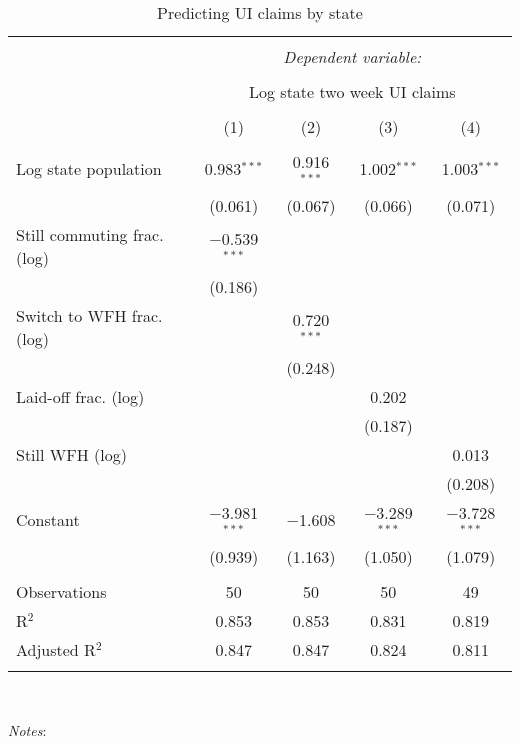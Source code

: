 
\begin{table}[!htbp] \centering 
  \caption{Predicting UI claims by state} 
  \label{tab:ui} 
\small 
\begin{tabular}{@{\extracolsep{5pt}}lcccc} 
\\[-1.8ex]\hline 
\hline \\[-1.8ex] 
 & \multicolumn{4}{c}{\textit{Dependent variable:}} \\ 
\cline{2-5} 
\\[-1.8ex] & \multicolumn{4}{c}{Log state two week UI claims} \\ 
\\[-1.8ex] & (1) & (2) & (3) & (4)\\ 
\hline \\[-1.8ex] 
 Log state population & 0.983$^{***}$ & 0.916$^{***}$ & 1.002$^{***}$ & 1.003$^{***}$ \\ 
  & (0.061) & (0.067) & (0.066) & (0.071) \\ 
  Still commuting frac. (log) & $-$0.539$^{***}$ &  &  &  \\ 
  & (0.186) &  &  &  \\ 
  Switch to WFH frac. (log) &  & 0.720$^{***}$ &  &  \\ 
  &  & (0.248) &  &  \\ 
  Laid-off frac. (log) &  &  & 0.202 &  \\ 
  &  &  & (0.187) &  \\ 
  Still WFH (log) &  &  &  & 0.013 \\ 
  &  &  &  & (0.208) \\ 
  Constant & $-$3.981$^{***}$ & $-$1.608 & $-$3.289$^{***}$ & $-$3.728$^{***}$ \\ 
  & (0.939) & (1.163) & (1.050) & (1.079) \\ 
 \hline \\[-1.8ex] 
Observations & 50 & 50 & 50 & 49 \\ 
R$^{2}$ & 0.853 & 0.853 & 0.831 & 0.819 \\ 
Adjusted R$^{2}$ & 0.847 & 0.847 & 0.824 & 0.811 \\ 
\hline 
\hline \\[-1.8ex] 
\end{tabular}
\\
\begin{minipage}{1.0 \textwidth}
{\footnotesize \emph{Notes}: 
\starlanguage}
\end{minipage}
\end{table}
